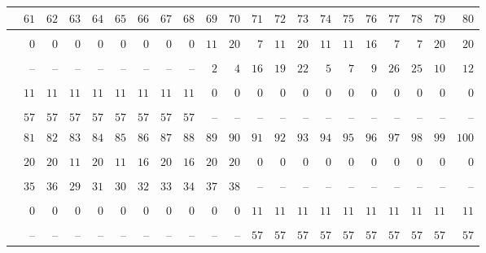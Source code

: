 \documentclass{amsart}
\theoremstyle{plain}
\theoremstyle{definition}
\theoremstyle{remark}
\begin{document}
{\begin{longtable}{rrrrrrrrrrrrrrrrrrrrr}
& $61$ & $62$ & $63$ & $64$ & $65$ & $66$ & $67$ & $68$ & $69$ & $70$ & $71$ & $72$ & $73$ & $74$ & $75$ & $76$ & $77$ & $78$ & $79$ & $80$\\\hline
\vspace*{-3mm}\\
& $0$ & $0$ & $0$ & $0$ & $0$ & $0$ & $0$ & $0$ & $11$ & $20$ & $7$ & $11$ & $20$ & $11$ & $11$ & $16$ & $7$ & $7$ & $20$ & $20$\\
\vspace*{-3mm}\\
& -- & -- & -- & -- & -- & -- & -- & -- & $2$ & $4$ & $16$ & $19$ & $22$ & $5$ & $7$ & $9$ & $26$ & $25$ & $10$ & $12$\\
\vspace*{-3mm}\\
& $11$ & $11$ & $11$ & $11$ & $11$ & $11$ & $11$ & $11$ & $0$ & $0$ & $0$ & $0$ & $0$ & $0$ & $0$ & $0$ & $0$ & $0$ & $0$ & $0$\\
\vspace*{-3mm}\\
& $57$ & $57$ & $57$ & $57$ & $57$ & $57$ & $57$ & $57$ & -- & -- & -- & -- & -- & -- & -- & -- & -- & -- & -- & --
\vspace*{5mm}\\
& $81$ & $82$ & $83$ & $84$ & $85$ & $86$ & $87$ & $88$ & $89$ & $90$ & $91$ & $92$ & $93$ & $94$ & $95$ & $96$ & $97$ & $98$ & $99$ & $100$\\\hline
\vspace*{-3mm}\\
& $20$ & $20$ & $11$ & $20$ & $11$ & $16$ & $20$ & $16$ & $20$ & $20$ & $0$ & $0$ & $0$ & $0$ & $0$ & $0$ & $0$ & $0$ & $0$ & $0$\\
\vspace*{-3mm}\\
& $35$ & $36$ & $29$ & $31$ & $30$ & $32$ & $33$ & $34$ & $37$ & $38$ & -- & -- & -- & -- & -- & -- & -- & -- & -- & --\\
\vspace*{-3mm}\\
& $0$ & $0$ & $0$ & $0$ & $0$ & $0$ & $0$ & $0$ & $0$ & $0$ & $11$ & $11$ & $11$ & $11$ & $11$ & $11$ & $11$ & $11$ & $11$ & $11$\\
\vspace*{-3mm}\\
& -- & -- & -- & -- & -- & -- & -- & -- & -- & -- & $57$ & $57$ & $57$ & $57$ & $57$ & $57$ & $57$ & $57$ & $57$ & $57$
\vspace*{5mm}\\

\end{longtable}}
\end{document}
